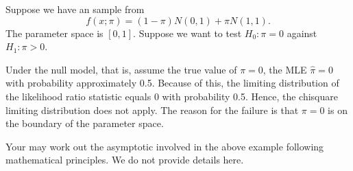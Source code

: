 \begin{example} 
Suppose we have an \iid sample from
\[
f(x; \pi) = (1-\pi) N(0, 1) + \pi N(1, 1).
\]
The parameter space is $[0, 1]$. Suppose we want to test
$H_0: \pi = 0$ against $H_1: \pi > 0$.

Under the null model, that is, assume the true value of $\pi = 0$,
the MLE $\hat \pi = 0$ with probability approximately 0.5. 
Because of this, the limiting distribution of the likelihood
ratio statistic equals 0 with probability 0.5.
Hence, the chisquare limiting distribution does not apply.
The reason for the failure is that $\pi = 0$ is on the boundary
of the parameter space.
\end{example}

Your may work out the asymptotic involved in the above example
following mathematical principles. We do not provide details here.


